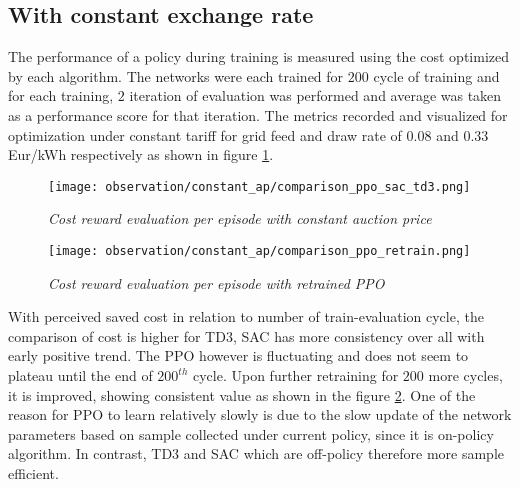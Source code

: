 \begin{large}
\subsection*{With constant exchange rate}

The performance of a policy during training is measured using the cost optimized by each algorithm. The networks were each trained for $200$ cycle of training and for each training, $2$ iteration of evaluation was performed and average was taken as a performance score for that iteration. The metrics recorded and visualized for optimization under constant tariff for grid feed and draw rate of $0.08$ and $0.33$ Eur/kWh respectively as shown in figure \ref{fig:cost_compare_constant_ap}. \\

\begin{figure}[h]
	\begin{center}
		\texttt{[image: observation/constant\_ap/comparison\_ppo\_sac\_td3.png]}
		\caption{ \textit{Cost reward evaluation per episode with constant auction price} }
		\label{fig:cost_compare_constant_ap}
	\end{center}
\end{figure}

\begin{figure}[h]
	\begin{center}
		\texttt{[image: observation/constant\_ap/comparison\_ppo\_retrain.png]}
		\caption{ \textit{Cost reward evaluation per episode with retrained PPO} }
		\label{fig:cost_compare_constant_ap_ppo_retrain}
	\end{center}
\end{figure}

With perceived saved cost in relation to number of train-evaluation cycle, the comparison of cost is higher for TD3, SAC has more consistency over all with early positive trend. The PPO however is fluctuating and does not seem to plateau until the end of $200^{th}$ cycle. Upon further retraining for $200$ more cycles, it is improved, showing consistent value as shown in the figure \ref{fig:cost_compare_constant_ap_ppo_retrain}. One of the reason for PPO to learn relatively slowly is due to the slow update of the network parameters based on sample collected under current policy, since it is on-policy algorithm. In contrast, TD3 and SAC which are off-policy therefore more sample efficient. \\


\end{large}
